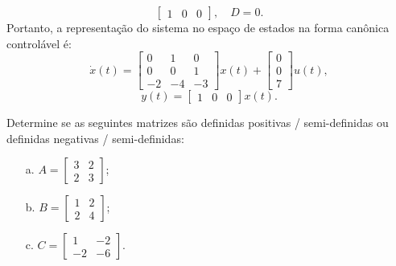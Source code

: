 \begin{resolution}
\[\begin{bmatrix}
      1 & 0 & 0
    \end{bmatrix}, \quad
    D = 0.
  \]
  Portanto, a representação do sistema no espaço de estados na forma canônica controlável é:
  \[
    \dot{{x}}(t) = \begin{bmatrix}
      0  & 1  & 0  \\
      0  & 0  & 1  \\
      -2 & -4 & -3
    \end{bmatrix} {x}(t) + \begin{bmatrix}
      0 \\ 0 \\ 7
    \end{bmatrix} u(t),
  \]
  \[
    y(t) = \begin{bmatrix}
      1 & 0 & 0
    \end{bmatrix} {x}(t).
  \]
\end{resolution}


\begin{question}
  Determine se as seguintes matrizes são definidas positivas / semi-definidas ou definidas negativas / semi-definidas:
  \begin{multicols}{3}
    \begin{itemize}
      \item[a.] $A = \begin{bmatrix} 3 & 2 \\ 2 & 3 \end{bmatrix}$;
      \item[b.] $B = \begin{bmatrix} 1 & 2 \\ 2 & 4 \end{bmatrix}$;
      \item[c.] $C = \begin{bmatrix} 1 & -2 \\ -2 & -6 \end{bmatrix}$.
    \end{itemize}
  \end{multicols}
  \vspace{8pt}
\end{question}

